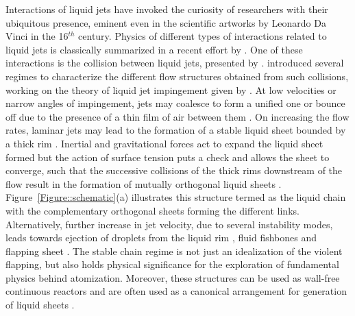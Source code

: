 \documentclass{jfm}
\begin{document}
Interactions of liquid jets have invoked the curiosity of researchers with their ubiquitous presence, eminent even in the scientific artworks by Leonardo Da Vinci in the 16$^{th}$ century. Physics of different types of interactions related to liquid jets is classically summarized in a recent effort by \cite{eggers2008physics}. One of these interactions is the collision between liquid jets, presented by \cite{rayleigh1879capillary}. \cite{bush2004collision} introduced several regimes to characterize the different flow structures obtained from such collisions, working on the theory of liquid jet impingement given by \cite{taylor1960formation}. At low velocities or narrow angles of impingement, jets may coalesce to form a unified one or bounce off due to the presence of a thin film of air between them \citep{wadhwa2013noncoalescence}. On increasing the flow rates, laminar jets may lead to the formation of a stable liquid sheet bounded by a thick rim \citep{yang2014liquid}. Inertial and gravitational forces act to expand the liquid sheet formed but the action of surface tension puts a check and allows the sheet to converge, such that the successive collisions of the thick rims downstream of the flow result in the formation of mutually orthogonal liquid sheets \citep{bush2004collision}. Figure~\ref{Figure::schematic}(a) illustrates this structure termed as the liquid chain with the complementary orthogonal sheets forming the different links. Alternatively, further increase in jet velocity, due to several instability modes, leads towards ejection of droplets from the liquid rim \citep{bremond2006atomization}, fluid fishbones \citep{bush2004collision} and flapping sheet \citep{villermaux2002life}. The stable chain regime is not just an idealization of the violent flapping, but also holds physical significance for the exploration of fundamental physics behind atomization. Moreover, these structures can be used as wall-free continuous reactors \citep{erni2013free} and are often used as a canonical arrangement for generation of liquid sheets \citep{bush2004collision,taylor1960formation}.\\
\end{document}
